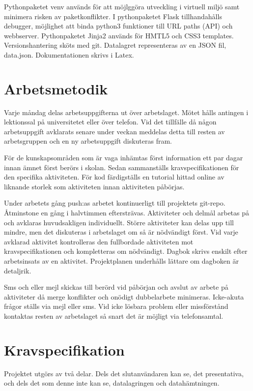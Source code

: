 \documentclass{TDP003mall}
\begin{document}
Pythonpaketet venv används för att möjlggöra utveckling i virtuell miljö samt minimera risken av paketkonflikter.
I pythonpaketet Flask tillhandahålls debugger, möjlighet att binda python3 funktioner till URL paths (API) och webbserver.
Pythonpaketet Jinja2 används för HMTL5 och CSS3 templates.
Versionshantering sköts med git.
Datalagret representeras av en JSON fil, data.json.
Dokumentationen skrivs i Latex.

\newpage

\section{Arbetsmetodik}
Varje måndag delas arbetsuppgifterna ut över arbetslaget. Mötet hålls antingen i lektionssal på universitetet eller över telefon. Vid det tillfälle då någon arbetsuppgift avklarats senare under veckan meddelas detta till resten av arbetsgruppen och en ny arbetsuppgift diskuteras fram.

För de kunskapsområden som är vaga inhämtas först information ett par dagar innan ämnet först berörs i skolan. Sedan sammanställs kravspecifikationen för den specifika aktiviteten. För kod färdigställs en tutorial hittad online av liknande storlek som aktiviteten innan aktiviteten påbörjas.

Under arbetets gång push:as arbetet kontinuerligt till projektets git-repo. Åtminstone en gång i halvtimmen eftersträvas. Aktiviteter och delmål arbetas på och avklaras huvudsakligen individuellt. Större aktiviteter kan delas upp till mindre, men det diskuteras i arbetslaget om så är nödvändigt först. Vid varje avklarad aktivitet kontrolleras den fullbordade aktiviteten mot kravspecifikationen och kompletteras om nödvändigt. Dagbok skrivs enskilt efter arbetsinsats av en aktivitet. Projektplanen underhålls lättare om dagboken är detaljrik.

Sms och eller mejl skickas till berörd vid påbörjan och avslut av arbete på aktiviteter då merge konflikter och onödigt dubbelarbete minimeras. Icke-akuta frågor ställs via mejl eller sms. Vid icke lösbara problem eller missförstånd kontaktas resten av arbetslaget så snart det är möjligt via telefonsamtal.

\section{Kravspecifikation}
Projektet utgörs av två delar. Dels det slutanvändaren kan se, det presentativa,
och dels det som denne inte kan se, datalagringen och datahämtningen.
\end{document}
